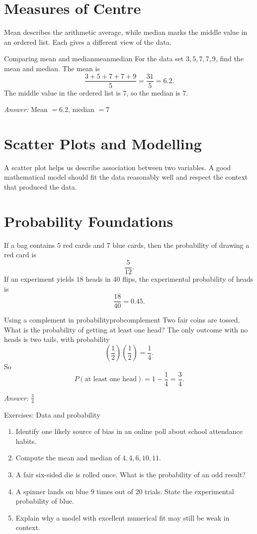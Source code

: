 \documentclass[11pt,oneside]{book}
\newcommand{\answerline}{\par\smallskip\noindent\textit{Answer: }}
\begin{document}
\section{Measures of Centre}
Mean describes the arithmetic average, while median marks the middle value in an ordered list. Each gives a different view of the data.

\begin{example}{Comparing mean and median}{meanmedian}
For the data set $3,5,7,7,9$, find the mean and median.
\tcblower
The mean is
\[
\frac{3+5+7+7+9}{5}=\frac{31}{5}=6.2.
\]
The middle value in the ordered list is $7$, so the median is $7$.
\answerline Mean $=6.2$, median $=7$
\end{example}

\section{Scatter Plots and Modelling}
A scatter plot helps us describe association between two variables. A good mathematical model should fit the data reasonably well and respect the context that produced the data.

\section{Probability Foundations}
If a bag contains $5$ red cards and $7$ blue cards, then the probability of drawing a red card is
\[
\frac{5}{12}.
\]
If an experiment yields $18$ heads in $40$ flips, the experimental probability of heads is
\[
\frac{18}{40}=0.45.
\]

\begin{example}{Using a complement in probability}{probcomplement}
Two fair coins are tossed. What is the probability of getting at least one head?
\tcblower
The only outcome with no heads is two tails, with probability
\[
\left(\frac{1}{2}\right)\left(\frac{1}{2}\right)=\frac{1}{4}.
\]
So
\[
P(\text{at least one head})=1-\frac{1}{4}=\frac{3}{4}.
\]
\answerline $\frac{3}{4}$
\end{example}

\begin{exercisebox}{Exercises: Data and probability}
\begin{enumerate}
  \item Identify one likely source of bias in an online poll about school attendance habits.
  \item Compute the mean and median of $4,4,6,10,11$.
  \item A fair six-sided die is rolled once. What is the probability of an odd result?
  \item A spinner lands on blue $9$ times out of $20$ trials. State the experimental probability of blue.
  \item Explain why a model with excellent numerical fit may still be weak in context.
\end{enumerate}
\end{exercisebox}
\end{document}
